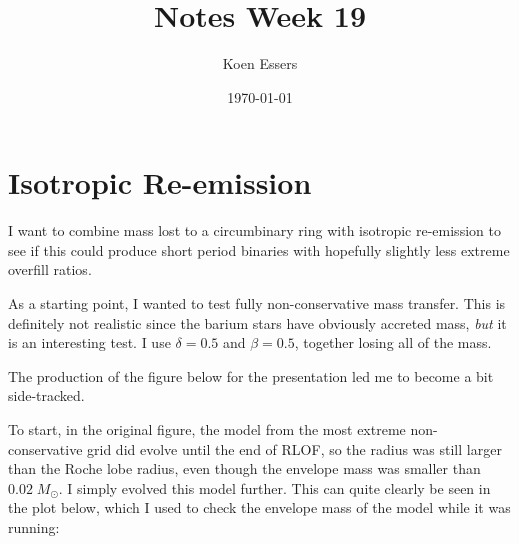 \documentclass[a4paper,10pt]{article}
\title{Notes Week 19}
\author{Koen Essers}
\date{\today}
\begin{document}
\setuplayout
\section{Isotropic Re-emission}

I want to combine mass lost to a circumbinary ring with isotropic re-emission to see if this could produce short period binaries with hopefully slightly less extreme overfill ratios.

\begin{figure}[ht]
    \centering
\end{figure}

\begin{figure}[ht]
    \centering
\end{figure}
\nextpage
\begin{figure}[ht]
    \centering
\end{figure}

\begin{figure}[ht]
    \centering
\end{figure}

\begin{figure}[ht]
    \centering
\end{figure}


As a starting point, I wanted to test fully non-conservative mass transfer. This is definitely not realistic since the barium stars have obviously accreted mass, \emph{but} it is an interesting test. I use \(\delta =0.5\) and \(\beta =0.5\), together losing all of the mass.


The production of the figure below for the presentation led me to become a bit side-tracked.

\begin{figure}[ht]
    \centering
\end{figure}

To start, in the original figure, the model from the most extreme non-conservative grid did evolve until the end of RLOF, so the radius was still larger than the Roche lobe radius, even though the envelope mass was smaller than \(0.02\;M_\odot \). I simply evolved this model further. This can quite clearly be seen in the plot below, which I used to check the envelope mass of the model while it was running:
\end{document}
